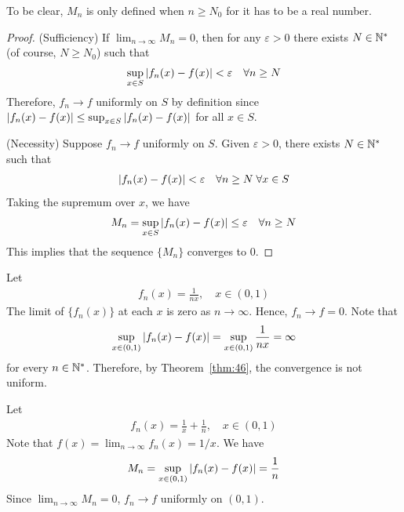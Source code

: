 \documentclass[thmcnt=section, 12pt]{my-elegantbook}
\begin{document}
\begin{note}
    To be clear, $M_n$ is only defined when $n \geq N_0$ for it has to be a real number.
\end{note}

\begin{proof}
    (Sufficiency) If $\lim_{n \to \infty} M_n = 0$, then for any $\varepsilon > 0$ there exists $N \in \mathbb{N}^\ast$ (of course, $N \geq N_0$) such that
    \begin{align*}
        \sup_{x \in S} \left\lvert f_n(x) - f(x) \right\rvert < \varepsilon
        \quad \forall n \geq N
    \end{align*}
    Therefore, $f_n \to f$ uniformly on $S$ by definition since $\left\lvert f_n(x) - f(x) \right\rvert \leq \sup_{x \in S} \left\lvert f_n(x) - f(x) \right\rvert$ for all $x \in S$.

    (Necessity) Suppose $f_n \to f$ uniformly on $S$. Given $\varepsilon > 0$, there exists $N \in \mathbb{N}^\ast$ such that
    \begin{align*}
        \left\lvert f_n(x) - f(x) \right\rvert < \varepsilon
        \quad \forall n \geq N \;
        \forall x \in S
    \end{align*}
    Taking the supremum over $x$, we have
    \begin{align*}
        M_n
        = \sup_{x \in S} \left\lvert f_n(x) - f(x) \right\rvert \leq \varepsilon
        \quad \forall n \geq N
    \end{align*}
    This implies that the sequence $\{M_n\}$ converges to $0$.
\end{proof}

\begin{example}
    Let
    \begin{align*}
        f_n(x) = \frac{1}{nx},
        \quad x \in (0, 1)
    \end{align*}
    The limit of $\{f_n(x)\}$ at each $x$ is zero as $n \to \infty$. Hence, $f_n \to f = 0$. Note that
    \begin{align*}
        \sup_{x \in (0, 1)} \left\lvert f_n(x) - f(x) \right\rvert
        = \sup_{x \in (0, 1)} \frac{1}{nx}
        = \infty
    \end{align*}
    for every $n \in \mathbb{N}^\ast$. Therefore, by Theorem~\ref{thm:46}, the convergence is not uniform.
\end{example}

\begin{example}
    Let
    \begin{align*}
        f_n(x) = \frac{1}{x} + \frac{1}{n},
        \quad x \in (0, 1)
    \end{align*}
    Note that $f(x) = \lim_{n \to \infty} f_n(x) = 1 / x$. We have
    \begin{align*}
        M_n = \sup_{x \in (0, 1)} \left\lvert f_n(x) - f(x) \right\rvert
        = \frac{1}{n}
    \end{align*}
    Since $\lim_{n \to \infty} M_n = 0$, $f_n \to f$ uniformly on $(0, 1)$.
\end{example}
\end{document}
